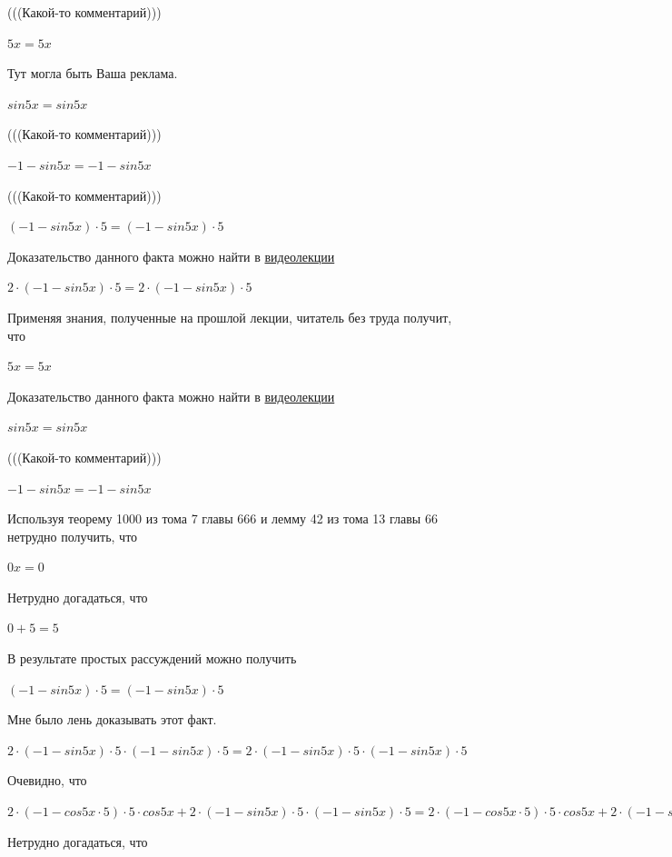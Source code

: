 \documentclass[12pt,a4paper,fleqn]{article}
\theoremstyle{definition}
\begin{document}
(((Какой-то комментарий))) 

$ 5  x  =  5  x $

Тут могла быть Ваша реклама. 

$sin 5  x  = sin 5  x $

(((Какой-то комментарий))) 

$ -1  - sin 5  x  =  -1  - sin 5  x $

(((Какой-то комментарий))) 

$( -1  - sin 5  x ) \cdot  5  = ( -1  - sin 5  x ) \cdot  5 $

Доказательство данного факта можно найти в \href{https://www.youtube.com/watch?v=dQw4w9WgXcQ}{видеолекции} 

$ 2  \cdot ( -1  - sin 5  x ) \cdot  5  =  2  \cdot ( -1  - sin 5  x ) \cdot  5 $

Применяя знания, полученные на прошлой лекции, читатель без труда получит, что 

$ 5  x  =  5  x $

Доказательство данного факта можно найти в \href{https://www.youtube.com/watch?v=dQw4w9WgXcQ}{видеолекции} 

$sin 5  x  = sin 5  x $

(((Какой-то комментарий))) 

$ -1  - sin 5  x  =  -1  - sin 5  x $

Используя теорему 1000 из тома 7 главы 666 и лемму 42 из тома 13 главы 66 нетрудно получить, что 

$ 0  x  =  0 $

Нетрудно догадаться, что 

$ 0  +  5  =  5 $

В результате простых рассуждений можно получить 

$( -1  - sin 5  x ) \cdot  5  = ( -1  - sin 5  x ) \cdot  5 $

Мне было лень доказывать этот факт.

$ 2  \cdot ( -1  - sin 5  x ) \cdot  5  \cdot ( -1  - sin 5  x ) \cdot  5  =  2  \cdot ( -1  - sin 5  x ) \cdot  5  \cdot ( -1  - sin 5  x ) \cdot  5 $

Очевидно, что 

$ 2  \cdot ( -1  - cos 5  x  \cdot  5 ) \cdot  5  \cdot cos 5  x  +  2  \cdot ( -1  - sin 5  x ) \cdot  5  \cdot ( -1  - sin 5  x ) \cdot  5  =  2  \cdot ( -1  - cos 5  x  \cdot  5 ) \cdot  5  \cdot cos 5  x  +  2  \cdot ( -1  - sin 5  x ) \cdot  5  \cdot ( -1  - sin 5  x ) \cdot  5 $

Нетрудно догадаться, что 
\end{document}

